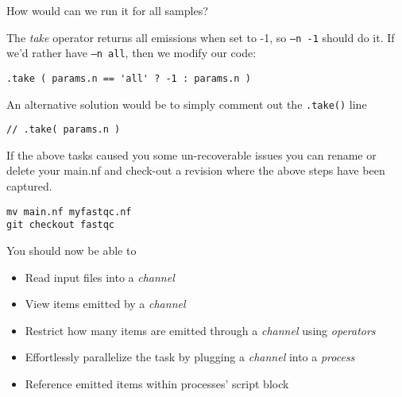 \begin{bonus}
\begin{questions}
How would can we run it for all samples?
\begin{answer}
The \emph{take} operator returns all emissions when set to -1, 
so \texttt{--n -1} should do it. If we'd rather have \texttt{--n all},
then we modify our code: 
\begin{lstlisting}
.take ( params.n == 'all' ? -1 : params.n ) 
\end{lstlisting}

An alternative solution would be to simply comment out the \texttt{.take()} line
\begin{lstlisting}
// .take( params.n )
\end{lstlisting}

\end{answer}
\end{questions}
\end{bonus}

\begin{note}
If the above tasks caused you some un-recoverable issues you can rename or delete your main.nf and check-out a revision where the above steps have been captured.
\begin{lstlisting}
mv main.nf myfastqc.nf
git checkout fastqc
\end{lstlisting}
\end{note}

You should now be able to 

\begin{itemize}
 \item Read input files into a \emph{channel}
 \item View items emitted by a \emph{channel}
 \item Restrict how many items are emitted through a \emph{channel} using \emph{operators}
 \item Effortlessly parallelize the task by plugging a \emph{channel} into a \emph{process}
 \item Reference emitted items within processes' script block
\end{itemize}

%
